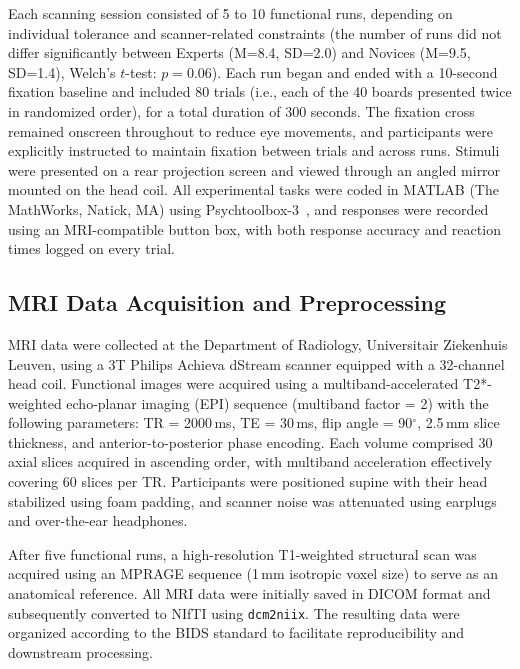 \documentclass[preprint,12pt]{elsarticle}
\begin{document}
Each scanning session consisted of 5 to 10 functional runs, depending on individual tolerance and scanner-related constraints (the number of runs did not differ significantly between Experts (M=8.4, SD=2.0) and Novices (M=9.5, SD=1.4), Welch’s $t$-test: $p=0.06$). Each run began and ended with a 10-second fixation baseline and included 80 trials (i.e., each of the 40 boards presented twice in randomized order), for a total duration of 300 seconds. The fixation cross remained onscreen throughout to reduce eye movements, and participants were explicitly instructed to maintain fixation between trials and across runs. Stimuli were presented on a rear projection screen and viewed through an angled mirror mounted on the head coil. All experimental tasks were coded in MATLAB (The MathWorks, Natick, MA) using Psychtoolbox-3~\cite{brainard1997psychophysics}, and responses were recorded using an MRI-compatible button box, with both response accuracy and reaction times logged on every trial.

\subsection{MRI Data Acquisition and Preprocessing}
MRI data were collected at the Department of Radiology, Universitair Ziekenhuis Leuven, using a 3T Philips Achieva dStream scanner equipped with a 32-channel head coil. Functional images were acquired using a multiband-accelerated T2*-weighted echo-planar imaging (EPI) sequence (multiband factor = 2) with the following parameters: TR = 2000\,ms, TE = 30\,ms, flip angle = 90$^\circ$, 2.5\,mm slice thickness, and anterior-to-posterior phase encoding. Each volume comprised 30 axial slices acquired in ascending order, with multiband acceleration effectively covering 60 slices per TR. Participants were positioned supine with their head stabilized using foam padding, and scanner noise was attenuated using earplugs and over-the-ear headphones.

After five functional runs, a high-resolution T1-weighted structural scan was acquired using an MPRAGE sequence (1\,mm isotropic voxel size) to serve as an anatomical reference. All MRI data were initially saved in DICOM format and subsequently converted to NIfTI using \texttt{dcm2niix}\cite{li2016first}. The resulting data were organized according to the BIDS standard \cite{gorgolewski2016brain} to facilitate reproducibility and downstream processing.
\end{document}

